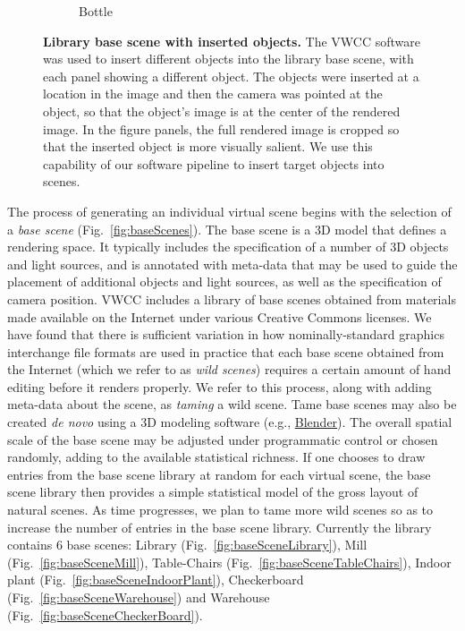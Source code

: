 \documentclass{jov}
\begin{document}
\begin{figure}
\begin{subfigure}[b]{0.14 \textwidth}
        \caption{Bottle}
        \label{fig:libraryWithChampagneBottle}
    \end{subfigure}
\caption{{\bf Library base scene with inserted objects.} The VWCC software was used to insert different objects into the library base scene, with each panel showing a different object. The objects were inserted at a location in the image and then the camera was pointed at the object, so that the object's image is at the center of the rendered image.  In the figure panels, the full rendered image is cropped so that the inserted object is more visually salient. We use this capability of our software pipeline to insert target objects into scenes.}\label{fig:libraryWithTarget}
\end{figure}

The process of generating an individual virtual scene begins with the selection of a \textit{base scene} (Fig.~\ref{fig:baseScenes}). The base scene is a 3D model that defines a rendering space.  It typically includes the specification of a number of 3D objects and light sources, and is annotated with meta-data that may be used to guide the placement of additional objects and light sources, as well as the specification of camera position. VWCC includes a library of base scenes obtained from materials made available on the Internet under various Creative Commons licenses. We have found that there is sufficient variation in how nominally-standard graphics interchange file formats are used in practice that each base scene obtained from the Internet (which we refer to as \textit{wild scenes}) requires a certain amount of hand editing before it renders properly. We refer to this process, along with adding meta-data about the scene, as \textit{taming} a wild scene. Tame base scenes may also be created {\it de novo} using a 3D modeling software (e.g., \href{https://www.blender.org/}{Blender}).  The overall spatial scale of the base scene may be adjusted under programmatic control or chosen randomly, adding to the available statistical richness. If one chooses to draw entries from the base scene library at random for each virtual scene, the base scene library then provides a simple statistical model of the gross layout of natural scenes. As time progresses, we plan to tame more wild scenes so as to increase the number of entries in the base scene library. Currently the library contains 6 base scenes: Library (Fig.~\ref{fig:baseSceneLibrary}), Mill (Fig.~\ref{fig:baseSceneMill}), Table-Chairs (Fig.~\ref{fig:baseSceneTableChairs}), Indoor plant (Fig.~\ref{fig:baseSceneIndoorPlant}), Checkerboard (Fig.~\ref{fig:baseSceneWarehouse}) and Warehouse (Fig.~\ref{fig:baseSceneCheckerBoard}).
\end{document}
